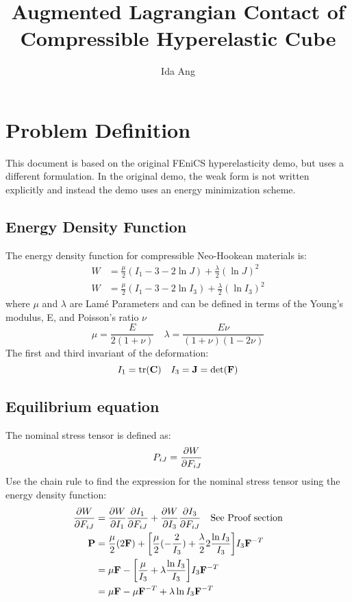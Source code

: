\documentclass[12pt,3p]{article}
\begin{document}
\title{Augmented Lagrangian Contact of Compressible Hyperelastic Cube \\
	\large{} }
\author{Ida Ang}
\date{\vspace{-5ex}}
\maketitle

\section{Problem Definition}
This document is based on the original FEniCS hyperelasticity demo, but uses a different formulation. In the original demo, the weak form is not written explicitly and instead the demo uses an energy minimization scheme. 

\subsection{Energy Density Function}
The energy density function for compressible Neo-Hookean materials is: 
\begin{align}\label{EDComp}
W &= \frac{\mu}{2} (I_1 - 3 - 2 \ln J) + \frac{\lambda}{2} (\ln J)^2 \\
W &= \frac{\mu}{2} (I_1 - 3 - 2 \ln I_3) + \frac{\lambda}{2} (\ln I_3)^2
\end{align}
where $\mu$ and $\lambda$ are Lamé Parameters and can be defined in terms of the Young's modulus, E, and Poisson's ratio $\nu$
\begin{equation}\label{lame}
\mu = \frac{E}{2 (1 + \nu)} \quad \lambda = \frac{E \nu}{(1+ \nu) (1 - 2 \nu)} 
\end{equation}
The first and third invariant of the deformation:
\begin{equation}\label{invariants}
I_1 = \trace(\mathbf{C}) \quad I_3 = \mathbf{J} = \det(\mathbf{F})  
\end{equation}

\subsection{Equilibrium equation}
The nominal stress tensor is defined as: 
\begin{equation}\label{PW}
P_{iJ} = \pdv{W}{F_{iJ}}
\end{equation}
Use the chain rule to find the expression for the nominal stress tensor using the energy density function: 
\begin{align*} 
\pdv{W}{F_{iJ}} &= \pdv{W}{I_1} \pdv{I_1}{F_{iJ}} + \pdv{W}{I_3} \pdv{I_3}{F_{iJ}} \quad \text{See Proof section} \\
\mathbf{P} &= \frac{\mu}{2} (2 \mathbf{F}) + \bigg[ \frac{\mu}{2} (-\frac{2}{I_3}) + \frac{\lambda}{2} 2 \frac{ \ln I_3 }{I_3} \bigg] I_3 \mathbf{F}^{-T} \\
		&= \mu \mathbf{F} - \bigg[ \frac{\mu}{I_3} + \lambda \frac{\ln I_3}{I_3} \bigg] I_3 \mathbf{F}^{-T} \\
		&= \mu \mathbf{F} - \mu \mathbf{F}^{-T} + \lambda \ln I_3  \mathbf{F}^{-T} 
\end{align*}
\end{document}
